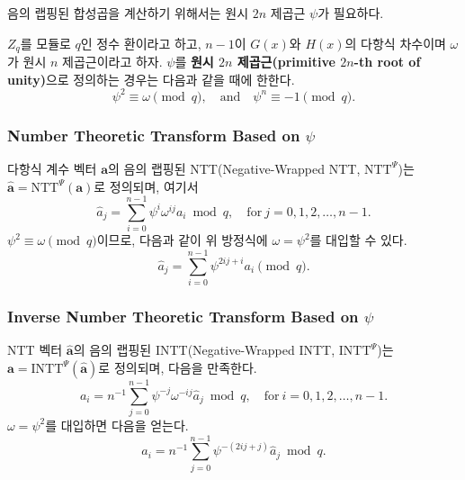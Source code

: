 음의 랩핑된 합성곱을 계산하기 위해서는 원시 $2n$ 제곱근 $\psi$가 필요하다.

\begin{tcolorbox}[colback=white, boxrule=0.7pt, sharp corners]
\begin{definition}
$Z_q$를 모듈로 $q$인 정수 환이라고 하고, $n-1$이 $G(x)$와 $H(x)$의 다항식 차수이며 $\omega$가 원시 $n$ 제곱근이라고 하자. $\psi$를 \textbf{원시 $2n$ 제곱근(primitive $2n$-th root of unity)}으로 정의하는 경우는 다음과 같을 때에 한한다.
\begin{equation}
    \psi^2 \equiv \omega \pmod q, \quad \text{and} \quad \psi^n \equiv -1 \pmod q.
\end{equation}
\end{definition}
\end{tcolorbox}

\subsubsection{Number Theoretic Transform Based on $\psi$}

\begin{tcolorbox}[colback=white, boxrule=0.7pt, sharp corners]
\begin{definition}
다항식 계수 벡터 $\mathbf{a}$의 음의 랩핑된 NTT(Negative-Wrapped NTT, $\text{NTT}^{\Psi}$)는 $\mathbf{\hat{a}} = \text{NTT}^{\Psi}(\mathbf{a})$로 정의되며, 여기서
\begin{equation}
    \label{equ:ntt_psi}
    \hat{a}_j = \sum_{i=0}^{n-1} \psi^i \omega^{ij} a_i \bmod q, \quad \text{for} \ j = 0, 1, 2, \dots, n-1.
\end{equation}
$\psi^2 \equiv \omega \pmod q$이므로, 다음과 같이 위 방정식에 $\omega = \psi^2$를 대입할 수 있다.
\begin{equation}
    \hat{a}_j = \sum_{i=0}^{n-1} \psi^{2ij+i} a_i \pmod q.
\end{equation}
\end{definition}
\end{tcolorbox}

\subsubsection{Inverse Number Theoretic Transform Based on $\psi$}

\begin{tcolorbox}[colback=white, boxrule=0.7pt, sharp corners]
\begin{definition}
NTT 벡터 $\mathbf{\hat{a}}$의 음의 랩핑된 INTT(Negative-Wrapped INTT, $\text{INTT}^{\Psi}$)는 $\mathbf{a} = \text{INTT}^{\Psi}(\mathbf{\hat{a}})$로 정의되며, 다음을 만족한다.
\begin{equation}
    a_i = n^{-1}\sum_{j=0}^{n-1} \psi^{-j}\omega^{-ij}\hat{a}_j \bmod q, \quad \text{for} \ i = 0, 1, 2, \dots, n-1.
\end{equation}
$\omega = \psi^2$를 대입하면 다음을 얻는다.
\begin{equation}
    a_i = n^{-1}\sum_{j=0}^{n-1} \psi^{-(2ij+j)}\hat{a}_j \bmod q.
\end{equation}
\end{definition}
\end{tcolorbox}

